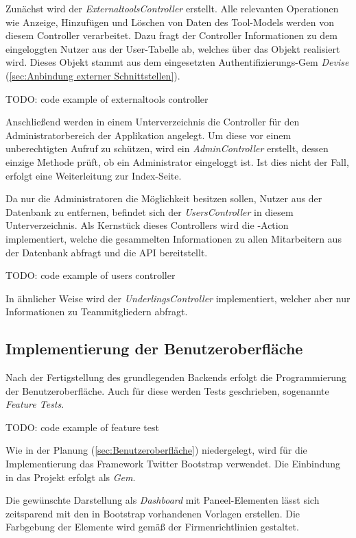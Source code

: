Zunächst wird der \textit{ExternaltoolsController} erstellt. Alle relevanten Operationen
wie Anzeige, Hinzufügen und Löschen von Daten des Tool-Models werden von diesem Controller
verarbeitet. Dazu fragt der Controller Informationen zu dem eingeloggten Nutzer aus der User-Tabelle
ab, welches über das Objekt  realisiert wird. Dieses Objekt stammt aus dem
eingesetzten Authentifizierungs-Gem \textit{Devise} (\Vgl \ref{sec:Anbindung externer Schnittstellen}).

TODO: code example of externaltools controller

Anschließend werden in einem Unterverzeichnis die Controller für den Administratorbereich der
Applikation angelegt. Um diese vor einem unberechtigten Aufruf zu schützen, wird ein
\textit{AdminController} erstellt, dessen einzige Methode prüft, ob ein Administrator eingeloggt ist.
Ist dies nicht der Fall, erfolgt eine Weiterleitung zur Index-Seite.

Da nur die Administratoren die Möglichkeit besitzen sollen, Nutzer aus der Datenbank zu entfernen,
befindet sich der \textit{UsersController} in diesem Unterverzeichnis. Als Kernstück dieses
Controllers wird die -Action implementiert, welche die gesammelten Informationen
zu allen Mitarbeitern aus der Datenbank abfragt und die API bereitstellt.

TODO: code example of users controller

In ähnlicher Weise wird der \textit{UnderlingsController} implementiert, welcher aber nur
Informationen zu Teammitgliedern abfragt.

\subsection{Implementierung der Benutzeroberfläche}
\label{sec:Implementierung der Benutzeroberfläche}
Nach der Fertigstellung des grundlegenden Backends erfolgt die Programmierung der Benutzeroberfläche.
Auch für diese werden Tests geschrieben, sogenannte \textit{Feature Tests}.

TODO: code example of feature test

Wie in der Planung (\Vgl \ref{sec:Benutzeroberfläche}) niedergelegt, wird für die Implementierung
das Framework Twitter Bootstrap verwendet. Die Einbindung in das Projekt erfolgt als \textit{Gem}.

Die gewünschte Darstellung als \textit{Dashboard} mit Paneel-Elementen lässt sich zeitsparend mit
den in Bootstrap vorhandenen Vorlagen erstellen. Die Farbgebung der Elemente wird gemäß der
Firmenrichtlinien gestaltet.

